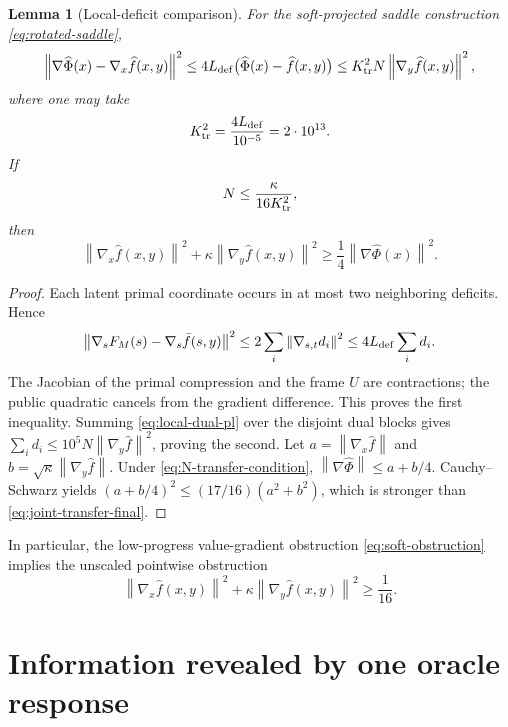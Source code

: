\documentclass[11pt,a4paper]{article}
\newcommand{\norm}[1]{\left\lVert #1\right\rVert}
\newtheorem{lemma}[theorem]{Lemma}
\theoremstyle{definition}
\theoremstyle{remark}
\numberwithin{equation}{section}
\begin{document}
\begin{lemma}[Local-deficit comparison]
\label{lem:joint-transfer}
For the soft-projected saddle construction \eqref{eq:rotated-saddle},
\begin{equation}
 \norm{\nabla\widehat\Phi(x)-\nabla_x\widehat f(x,y)}^2
 \le4L_{\rm def}\bigl(\widehat\Phi(x)-\widehat f(x,y)\bigr)
 \le K_{\rm tr}^2N\norm{\nabla_y\widehat f(x,y)}^2,
 \label{eq:transfer-chain}
\end{equation}
where one may take
\begin{equation}
 K_{\rm tr}^2=\frac{4L_{\rm def}}{10^{-5}}=2\cdot10^{13}.
 \label{eq:Ktr}
\end{equation}
If
\begin{equation}
 N\le\frac{\kappa}{16K_{\rm tr}^2},
 \label{eq:N-transfer-condition}
\end{equation}
then
\begin{equation}
 \norm{\nabla_x\widehat f(x,y)}^2
 +\kappa\norm{\nabla_y\widehat f(x,y)}^2
 \ge\frac14\norm{\nabla\widehat\Phi(x)}^2.
 \label{eq:joint-transfer-final}
\end{equation}
\end{lemma}

\begin{proof}
Each latent primal coordinate occurs in at most two neighboring deficits.  Hence
\[
 \norm{\nabla_sF_M(s)-\nabla_s\bar f(s,y)}^2
 \le2\sum_i\norm{\nabla_{s,t}d_i}^2
 \le4L_{\rm def}\sum_i d_i.
\]
The Jacobian of the primal compression and the frame $U$ are contractions; the public quadratic cancels from the gradient difference.  This proves the first inequality.  Summing \eqref{eq:local-dual-pl} over the disjoint dual blocks gives
$\sum_id_i\le10^5N\norm{\nabla_y\widehat f}^2$, proving the second.
Let $a=\norm{\nabla_x\widehat f}$ and
$b=\sqrt\kappa\norm{\nabla_y\widehat f}$.  Under \eqref{eq:N-transfer-condition},
$\norm{\nabla\widehat\Phi}\le a+b/4$.  Cauchy--Schwarz yields
$(a+b/4)^2\le(17/16)(a^2+b^2)$, which is stronger than \eqref{eq:joint-transfer-final}.
\end{proof}

In particular, the low-progress value-gradient obstruction \eqref{eq:soft-obstruction} implies the unscaled pointwise obstruction
\begin{equation}
 \norm{\nabla_x\widehat f(x,y)}^2
 +\kappa\norm{\nabla_y\widehat f(x,y)}^2
 \ge\frac1{16}.
 \label{eq:unscaled-joint-obstruction}
\end{equation}

\section{Information revealed by one oracle response}
\label{sec:prefix}
\end{document}
